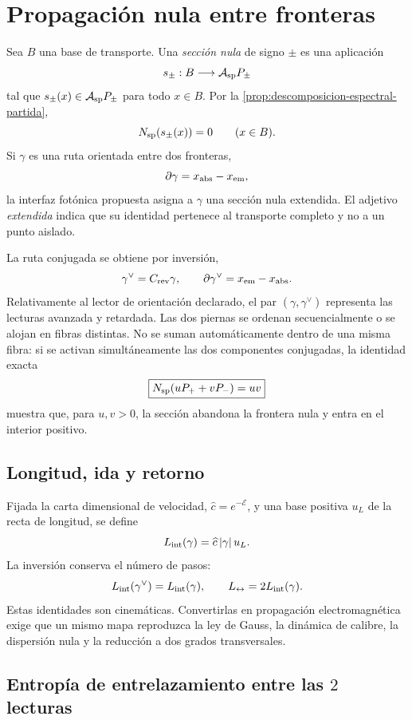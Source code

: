 \section{Propagación nula entre fronteras}
\label{sec:propagacion-nula-fotonica}

Sea \(B\) una base de transporte. Una \emph{sección nula} de signo
\(\pm\) es una aplicación
\[
 s_\pm:B\longrightarrow\mathcal A_{\rm sp}P_\pm
\]
tal que \(s_\pm(x)\in\mathcal A_{\rm sp}P_\pm\) para todo \(x\in B\).
Por la \cref{prop:descomposicion-espectral-partida},
\[
 N_{\rm sp}(s_\pm(x))=0
 \qquad(x\in B).
\]
Si \(\gamma\) es una ruta orientada entre dos fronteras,
\[
 \partial\gamma=x_{\rm abs}-x_{\rm em},
\]
la interfaz fotónica propuesta asigna a \(\gamma\) una sección nula
extendida. El adjetivo \emph{extendida} indica que su identidad pertenece al
transporte completo y no a un punto aislado.

La ruta conjugada se obtiene por inversión,
\[
 \gamma^\vee=C_{\rm rev}\gamma,
 \qquad
 \partial\gamma^\vee=x_{\rm em}-x_{\rm abs}.
\]
Relativamente al lector de orientación declarado, el par
\((\gamma,\gamma^\vee)\) representa las lecturas avanzada y retardada. Las
dos piernas se ordenan secuencialmente o se alojan en fibras distintas. No se
suman automáticamente dentro de una misma fibra: si se activan
simultáneamente las dos componentes conjugadas, la identidad exacta
\[
 \boxed{N_{\rm sp}(uP_++vP_-)=uv}
\]
muestra que, para \(u,v>0\), la sección abandona la frontera nula y entra en
el interior positivo.

\subsection{Longitud, ida y retorno}

Fijada la carta dimensional de velocidad,
\(\widehat c=e^{-\mathcal E}\), y una base positiva \(u_L\) de la recta de
longitud, se define
\[
 L_{\rm int}(\gamma)=\widehat c\,|\gamma|\,u_L.
\]
La inversión conserva el número de pasos:
\[
 L_{\rm int}(\gamma^\vee)=L_{\rm int}(\gamma),
 \qquad
 L_{\leftrightarrow}=2L_{\rm int}(\gamma).
\]
Estas identidades son cinemáticas. Convertirlas en propagación
electromagnética exige que un mismo mapa reproduzca la ley de Gauss, la
dinámica de calibre, la dispersión nula y la reducción a dos grados
transversales.

\subsection{Entropía de entrelazamiento entre las \(2\) lecturas}
\label{sec:entrelazamiento-ida-retorno}

